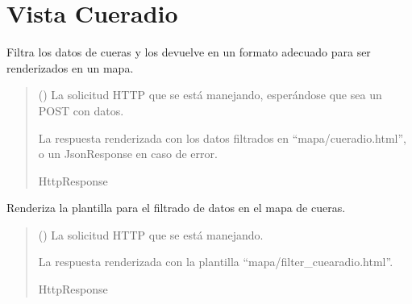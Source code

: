 \documentclass[letterpaper,10pt,spanish]{sphinxmanual}
\begin{document}
\section{Vista Cueradio}
\label{\detokenize{mapas:vista-cueradio}}

\begin{fulllineitems}

\pysigstartsignatures
{}
\pysigstopsignatures
\sphinxAtStartPar
Filtra los datos de cueras y los devuelve en un formato adecuado para ser renderizados en un mapa.
\begin{quote}\begin{description}
\sphinxAtStartPar
{} () \textendash{} La solicitud HTTP que se está manejando, esperándose que sea un POST con datos.

\sphinxAtStartPar
La respuesta renderizada con los datos filtrados en “mapa/cueradio.html”, o un JsonResponse en caso de error.

\sphinxAtStartPar
HttpResponse

\end{description}\end{quote}

\end{fulllineitems}



\begin{fulllineitems}

\pysigstartsignatures
{}
\pysigstopsignatures
\sphinxAtStartPar
Renderiza la plantilla para el filtrado de datos en el mapa de cueras.
\begin{quote}\begin{description}
\sphinxAtStartPar
{} () \textendash{} La solicitud HTTP que se está manejando.

\sphinxAtStartPar
La respuesta renderizada con la plantilla “mapa/filter\_cuearadio.html”.

\sphinxAtStartPar
HttpResponse

\end{description}\end{quote}

\end{fulllineitems}
\end{document}
